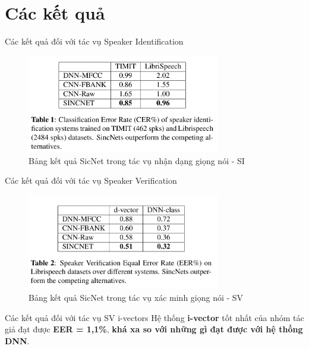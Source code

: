 \documentclass[notheorems, aspectratio=54]{beamer}
\begin{document}
\section{Các kết quả}
\begin{frame}{Các kết quả đối với tác vụ Speaker Identification}
\begin{figure}[H]
	\centering
	\includegraphics[width=0.75\textwidth]{images/performance_speaker_identification.png}
	\caption{Bảng kết quả SicNet trong tác vụ nhận dạng giọng nói - SI}
	\label{fig:writing-thesis}
\end{figure}	
\end{frame}
\begin{frame}{Các kết quả đối với tác vụ Speaker Verification}
\begin{figure}[H]
	\centering
	\includegraphics[width=0.75\textwidth]{images/performance_speaker_verification.png}
	\caption{Bảng kết quả SicNet trong tác vụ xác minh giọng nói - SV}
	\label{fig:writing-thesis}
\end{figure}	
\end{frame}
\begin{frame}{Các kết quả đối với tác vụ SV i-vectors}
	Hệ thống \textbf{i-vector} tốt nhất của nhóm tác giả đạt được \textbf{EER = 1,1\%}, \textbf{khá xa so với những gì đạt được với hệ thống DNN}.	
\end{frame}
\end{document}
